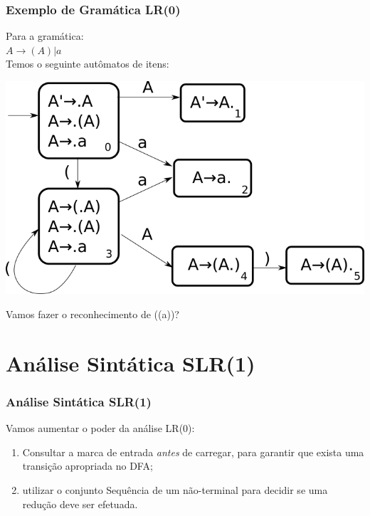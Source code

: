\documentclass[table]{beamer}
\begin{document}
\begin{frame}
   \frametitle{Exemplo de Gramática LR(0)}
   Para a gramática: \\
   $A\to(A)|a$ \\
   Temos o seguinte autômatos de itens: \\
   \begin{center}
   \includegraphics[scale=0.4]{figuras/aadfa.png}
   \end{center}
   Vamos fazer o reconhecimento de ((a))?
\end{frame}

\section{Análise Sintática SLR(1)}
\begin{frame}
   \frametitle{Análise Sintática SLR(1)}
   Vamos aumentar o poder da análise LR(0):
   \begin{enumerate}
      \item Consultar a marca de entrada \textit{antes} de carregar, para garantir que exista uma transição apropriada no DFA;
      \item utilizar o conjunto Sequência de um não-terminal para decidir se uma redução deve ser efetuada.
   \end{enumerate}
\end{frame}
\end{document}
